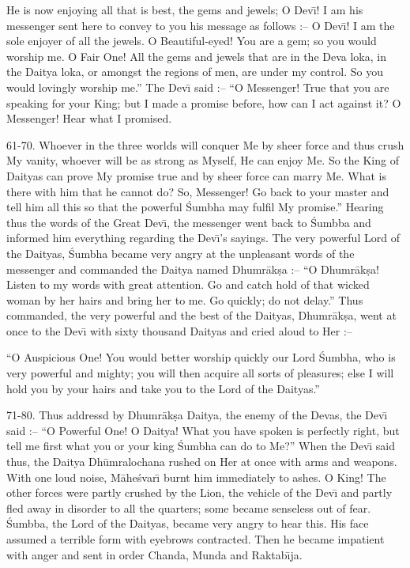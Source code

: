 He is now enjoying all that is best, the gems and jewels; O Dev\={\i}! I am his messenger sent here to convey to you his message as follows :-- O Dev\={\i}! I am the sole enjoyer of all the jewels. O Beautiful-eyed! You are a gem; so you would worship me. O Fair One! All the gems and jewels that are in the Deva loka, in the Daitya loka, or amongst the regions of men, are under my control. So you would lovingly worship me.'' The Dev\={\i} said :-- ``O Messenger! True that you are speaking for your King; but I made a promise before, how can I act against it? O Messenger! Hear what I promised.

61-70. Whoever in the three worlds will conquer Me by sheer force and thus crush My vanity, whoever will be as strong as Myself, He can enjoy Me. So the King of Daityas can prove My promise true and by sheer force can marry Me. What is there with him that he cannot do? So, Messenger! Go back to your master and tell him all this so that the powerful \'Sumbha may fulfil My promise.'' Hearing thus the words of the Great Dev\={\i}, the messenger went back to \'Sumbba and informed him everything regarding the Dev\={\i}'s sayings. The very powerful Lord of the Daityas, \'Sumbha became very angry at the unpleasant words of the messenger and commanded the Daitya named Dhumr\=ak\d{s}a :-- ``O Dhumr\=ak\d{s}a! Listen to my words with great attention. Go and catch hold of that wicked woman by her hairs and bring her to me. Go quickly; do not delay.'' Thus commanded, the very powerful and the best of the Daityas, Dhumr\=ak\d{s}a, went at once to the Dev\={\i} with sixty thousand Daityas and cried aloud to Her :--

``O Auspicious One! You would better worship quickly our Lord \'Sumbha, who is very powerful and mighty; you will then acquire all sorts of pleasures; else I will hold you by your hairs and take you to the Lord of the Daityas.''

71-80. Thus addressd by Dhumr\=ak\d{s}a Daitya, the enemy of the Devas, the Dev\={\i} said :-- ``O Powerful One! O Daitya! What you have spoken is perfectly right, but tell me first what you or your king \'Sumbha can do to Me?'' When the Dev\={\i} said thus, the Daitya Dh\=umralochana rushed on Her at once with arms and weapons. With one loud noise, M\=ahe\'svar\={\i} burnt him immediately to ashes. O King! The other forces were partly crushed by the Lion, the vehicle of the Dev\={\i} and partly fled away in disorder to all the quarters; some became senseless out of fear. \'Sumbba, the Lord of the Daityas, became very angry to hear this. His face assumed a terrible form with eyebrows contracted. Then he became impatient with anger and sent in order Chanda, Munda and Raktab\={\i}ja.

